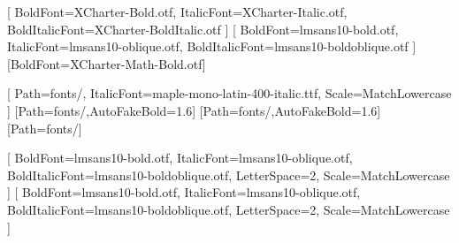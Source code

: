


\setmainfont{XCharter-Roman.otf}[
  BoldFont=XCharter-Bold.otf,
  ItalicFont=XCharter-Italic.otf,
  BoldItalicFont=XCharter-BoldItalic.otf
]
\setsansfont{lmsans10-regular.otf}[
  BoldFont=lmsans10-bold.otf,
  ItalicFont=lmsans10-oblique.otf,
  BoldItalicFont=lmsans10-boldoblique.otf
]
[BoldFont=XCharter-Math-Bold.otf]

\setmonofont{maple-mono-latin-400-normal.ttf}[
  Path=fonts/,
  ItalicFont=maple-mono-latin-400-italic.ttf,
  Scale=MatchLowercase
]
[Path=fonts/,AutoFakeBold=1.6]
[Path=fonts/,AutoFakeBold=1.6]
[Path=fonts/]

\newfontfamily{}[
  BoldFont=lmsans10-bold.otf,
  ItalicFont=lmsans10-oblique.otf,
  BoldItalicFont=lmsans10-boldoblique.otf,
  LetterSpace=2,
  Scale=MatchLowercase
]
\newfontfamily{}[
  BoldFont=lmsans10-bold.otf,
  ItalicFont=lmsans10-oblique.otf,
  BoldItalicFont=lmsans10-boldoblique.otf,
  LetterSpace=2,
  Scale=MatchLowercase
]
